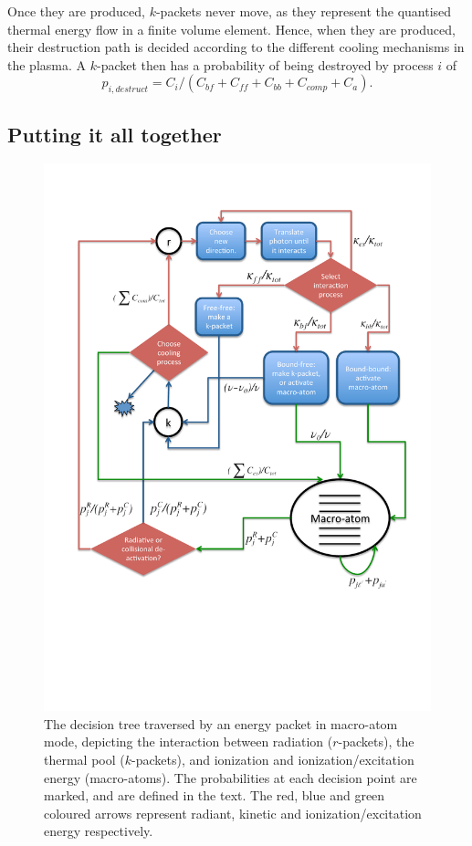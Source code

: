 Once they are produced, $k$-packets never move, as they represent the quantised
thermal energy flow in a finite volume element. Hence, when they are produced,
their destruction path is decided according to the different cooling mechanisms
in the plasma. A $k$-packet then has a probability of being destroyed by process $i$ of
\begin{equation}
p_{i,destruct} = C_i / (C_{bf} + C_{ff} + C_{bb} + C_{comp} + C_a).
\end{equation}



\subsection{Putting it all together}

\begin{figure}
\centering
\includegraphics[width=1.0\textwidth, clip=true, trim=0 2.6in 0in 0in ]{figures/03-radtrans/flow_colour.pdf}
\caption
{
The decision tree traversed by an energy packet 
in macro-atom mode, depicting the interaction
between radiation ($r$-packets), the thermal pool ($k$-packets), and ionization
and ionization/excitation energy (macro-atoms). 
The probabilities at each decision point are 
marked, and are defined in the text. The red, blue and green coloured arrows
represent radiant, kinetic and ionization/excitation energy respectively.
} 
\label{fig:flow_matom}
\end{figure}

